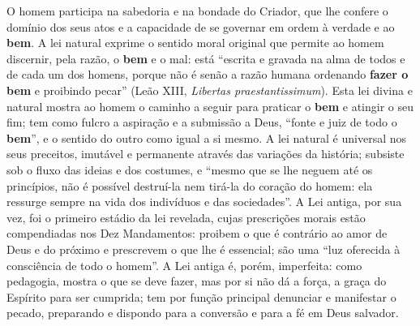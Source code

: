 O homem participa na sabedoria e na bondade do Criador, que lhe confere o domínio dos seus atos e a capacidade de se governar em ordem à verdade e ao \textbf{bem}. A lei natural exprime o sentido moral original que permite ao homem discernir, pela razão, o \textbf{bem} e o mal: está ``escrita e gravada na alma de todos e de cada um dos homens, porque não é senão a razão humana ordenando \textbf{fazer o bem} e proibindo pecar'' (Leão XIII, \textit{Libertas praestantissimum}). Esta lei divina e natural mostra ao homem o caminho a seguir para praticar o \textbf{bem} e atingir o seu fim; tem como fulcro a aspiração e a submissão a Deus, ``fonte e juiz de todo o \textbf{bem}'', e o sentido do outro como igual a si mesmo. A lei natural é universal nos seus preceitos, imutável e permanente através das variações da história; subsiste sob o fluxo das ideias e dos costumes, e ``mesmo que se lhe neguem até os princípios, não é possível destruí-la nem tirá-la do coração do homem: ela ressurge sempre na vida dos indivíduos e das sociedades''. A Lei antiga, por sua vez, foi o primeiro estádio da lei revelada, cujas prescrições morais estão compendiadas nos Dez Mandamentos: proibem o que é contrário ao amor de Deus e do próximo e prescrevem o que lhe é essencial; são uma ``luz oferecida à consciência de todo o homem''. A Lei antiga é, porém, imperfeita: como pedagogia, mostra o que se deve fazer, mas por si não dá a força, a graça do Espírito para ser cumprida; tem por função principal denunciar e manifestar o pecado, preparando e dispondo para a conversão e para a fé em Deus salvador.

